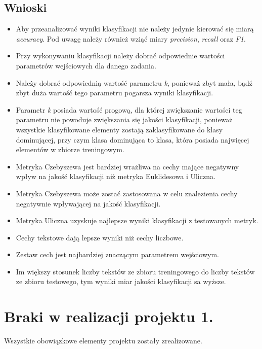 \documentclass{classrep}
\begin{document}
\subsection{Wnioski}
\begin{itemize}
\item Aby przeanalizować wyniki klasyfikacji nie należy jedynie kierować się miarą \textit{accuracy}. Pod uwagę należy również wziąć miary \textit{precision}, \textit{recall} oraz \textit{F1}. 
\item Przy wykonywaniu klasyfikacji należy dobrać odpowiednie wartości parametrów wejściowych dla danego zadania.
\item Należy dobrać odpowiednią wartość parametru \textit{k}, ponieważ zbyt mała, bądź zbyt duża wartość tego parametru pogarsza wyniki klasyfikacji. 
\item Parametr \textit{k} posiada wartość progową, dla której zwiększanie wartości teg parametru nie powoduje zwiększania się jakości klasyfikacji, ponieważ wszystkie klasyfikowane elementy zostają zaklasyfikowane do klasy dominującej, przy czym klasa dominująca to klasa, która posiada najwięcej elementów w zbiorze treningowym. 
\item Metryka Czebyszewa jest bardziej wrażliwa na cechy mające negatywny wpływ na jakość klasyfikacji niż metryka Euklidesowa i Uliczna.
\item Metryka Czebyszewa może zostać zastosowana w celu znalezienia cechy negatywnie wpływającej na jakość klasyfikacji. 
\item Metryka Uliczna uzyskuje najlepsze wyniki klasyfikacji z testowanych metryk.
\item Cechy tekstowe dają lepsze wyniki niż cechy liczbowe. 
\item Zestaw cech jest najbardziej znaczącym parametrem wejściowym.
\item Im większy stosunek liczby tekstów ze zbioru treningowego do liczby tekstów ze zbioru testowego, tym wyniki miar jakości klasyfikacji sa wyższe.
\end{itemize}


\section{Braki w realizacji projektu 1.}
Wszystkie obowiązkowe elementy projektu zostały zrealizowane.
\end{document}

